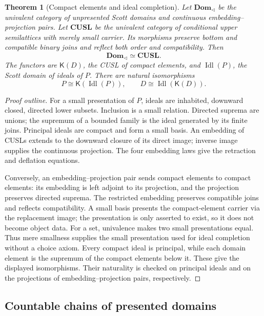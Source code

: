 \documentclass[11pt,a4paper]{article}
\newtheorem{theorem}{Theorem}[section]
\theoremstyle{definition}
\theoremstyle{remark}
\newcommand{\K}{\mathsf K}
\begin{document}
\begin{theorem}[Compact elements and ideal completion]
\label{thm:cusl-equivalence}
Let $\mathbf{Dom}_{\triangleleft}$ be the univalent category of unpresented
Scott domains and continuous embedding--projection pairs. Let
$\mathbf{CUSL}$ be the univalent category of conditional upper
semilattices with merely small carrier. Its morphisms preserve bottom and
compatible binary joins and reflect both order and compatibility. Then
\[
  \mathbf{Dom}_{\triangleleft}\simeq\mathbf{CUSL}.
\]
The functors are $\K(D)$, the CUSL of compact elements, and
$\operatorname{Idl}(P)$, the Scott domain of ideals of $P$. There are natural
isomorphisms
\[
  P\cong\K(\operatorname{Idl}(P)),\qquad
  D\cong\operatorname{Idl}(\K(D)).
\]
\end{theorem}
\begin{proof}[Proof outline]
For a small presentation of $P$, ideals are inhabited, downward closed,
directed lower subsets. Inclusion is a small relation. Directed suprema
are unions; the supremum of a bounded family is the ideal generated by
its finite joins. Principal ideals are compact and form a small basis.
An embedding of CUSLs extends to the downward closure of its direct image;
inverse image supplies the continuous projection. The four embedding
laws give the retraction and deflation equations.

Conversely, an embedding--projection pair sends compact elements to
compact elements: its embedding is left adjoint to its projection, and the
projection preserves directed suprema. The restricted embedding preserves
compatible joins and reflects compatibility. A small basis presents the
compact-element carrier via the replacement image; the presentation is
only asserted to exist, so it does not become object data.
For a set, univalence makes two small presentations equal. Thus mere
smallness supplies the small presentation used for ideal completion
without a choice axiom. Every compact ideal is principal, while each
domain element is the supremum of the compact elements below it. These
give the displayed isomorphisms. Their naturality is checked on principal
ideals and on the projections of embedding--projection pairs, respectively.
\end{proof}

\subsection{Countable chains of presented domains}
\end{document}
